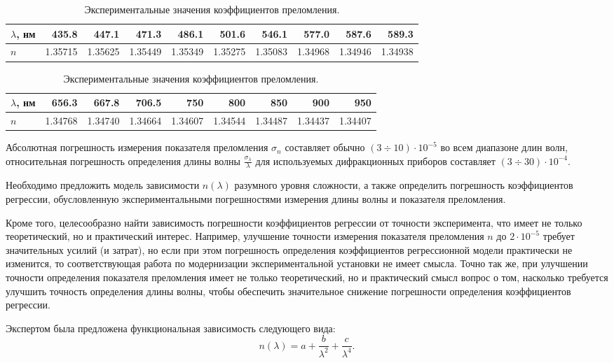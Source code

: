 \documentclass[11pt,a4paper]{article}
\theoremstyle{definition}
\begin{document}
\begin{table}[h]
  \footnotesize
  \begin{tabular}{| l | r | r | r | r | r | r | r | r | r |} \hline
	$\lambda$, нм	& 435.8		& 447.1		& 471.3		& 486.1		& 501.6		& 546.1		& 577.0		& 587.6		& 589.3		\\ \hline
	$n$				& 1.35715	& 1.35625	& 1.35449	& 1.35349	& 1.35275	& 1.35083	& 1.34968	& 1.34946	& 1.34938	\\ \hline
  \end{tabular}
  \begin{tabular}{| l | r | r | r | r | r | r | r | r |} \hline
	$\lambda$, нм	& 656.3		& 667.8		& 706.5		& 750		& 800		& 850		& 900		& 950			\\ \hline
	$n$				& 1.34768	& 1.34740	& 1.34664	& 1.34607	& 1.34544	& 1.34487	& 1.34437	& 1.34407		\\ \hline
  \end{tabular}
  \caption{Экспериментальные значения коэффициентов преломления.}
  \label{tabl:source_data}
\end{table}

Абсолютная погрешность измерения показателя преломления $\sigma_n$
составляет обычно $(3 \div 10) \cdot 10^{-5}$ во всем диапазоне длин волн, относительная
погрешность определения длины волны $\frac{\sigma_{\lambda}}{\lambda}$ для используемых
дифракционных приборов составляет $(3 \div 30) \cdot 10^{-4}$.

Необходимо предложить модель зависимости $n(\lambda)$ разумного уровня
сложности, а также определить погрешность коэффициентов регрессии,
обусловленную экспериментальными погрешностями измерения длины волны
и показателя преломления.

Кроме того, целесообразно найти зависимость
погрешности коэффициентов регрессии от точности эксперимента, что имеет
не только теоретический, но и практический интерес. Например, улучшение
точности измерения показателя преломления $n$ до $2 \cdot 10^{-5}$ требует значительных
усилий (и затрат), но если при этом погрешность определения коэффициентов
регрессионной модели практически не изменится, то соответствующая работа по
модернизации экспериментальной установки не имеет смысла. Точно так же,
при улучшении точности определения показателя преломления имеет не
только теоретический, но и практический смысл вопрос о том, насколько требуется
улучшить точность определения длины волны, чтобы
обеспечить значительное снижение погрешности определения коэффициентов
регрессии.

Экспертом была предложена функциональная зависимость
следующего вида:
\begin{equation}
  n(\lambda) = a + \frac{b}{\lambda^2} + \frac{c}{\lambda^4}.
  \label{eq:polymer_formula}
\end{equation}
\end{document}
